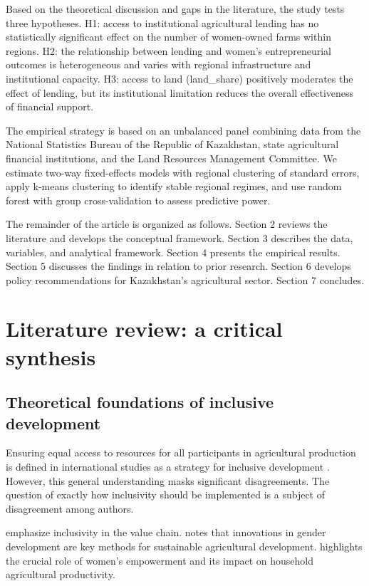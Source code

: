 ﻿\documentclass[pdflatex,sn-mathphys-ay]{sn-jnl}
\begin{document}
Based on the theoretical discussion and gaps in the literature, the study tests three hypotheses. H1: access to institutional agricultural lending has no statistically significant effect on the number of women-owned farms within regions. H2: the relationship between lending and women's entrepreneurial outcomes is heterogeneous and varies with regional infrastructure and institutional capacity. H3: access to land (land\_share) positively moderates the effect of lending, but its institutional limitation reduces the overall effectiveness of financial support.

The empirical strategy is based on an unbalanced panel combining data from the National Statistics Bureau of the Republic of Kazakhstan, state agricultural financial institutions, and the Land Resources Management Committee. We estimate two-way fixed-effects models with regional clustering of standard errors, apply k-means clustering to identify stable regional regimes, and use random forest with group cross-validation to assess predictive power.

The remainder of the article is organized as follows. Section 2 reviews the literature and develops the conceptual framework. Section 3 describes the data, variables, and analytical framework. Section 4 presents the empirical results. Section 5 discusses the findings in relation to prior research. Section 6 develops policy recommendations for Kazakhstan's agricultural sector. Section 7 concludes.

\section{Literature review: a critical synthesis}

\subsection{Theoretical foundations of inclusive development}

Ensuring equal access to resources for all participants in agricultural
production is defined in international studies as a strategy for
inclusive development \citep{ref29,ref44,ref77}. However, this general understanding masks
significant disagreements. The question of exactly how inclusivity
should be implemented is a subject of disagreement among authors.

\citet{ref81} emphasize inclusivity in the value chain.
\citet{ref24} notes that innovations in gender development are key
methods for sustainable agricultural development. \citet{ref27}
highlights the crucial role of women's empowerment and its impact on
household agricultural productivity.
\end{document}
